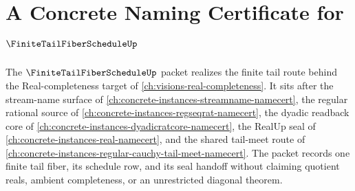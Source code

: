 \chapter{A Concrete Naming Certificate for $\FiniteTailFiberScheduleUp$}
\label{ch:concrete-instances-finite-tail-fiber-schedule-namecert}

The $\FiniteTailFiberScheduleUp$ packet realizes the finite tail route behind the Real-completeness target of \autoref{ch:visions-real-completeness}. It sits after the stream-name surface of \autoref{ch:concrete-instances-streamname-namecert}, the regular rational source of \autoref{ch:concrete-instances-regseqrat-namecert}, the dyadic readback core of \autoref{ch:concrete-instances-dyadicratcore-namecert}, the RealUp seal of \autoref{ch:concrete-instances-real-namecert}, and the shared tail-meet route of \autoref{ch:concrete-instances-regular-cauchy-tail-meet-namecert}. The packet records one finite tail fiber, its schedule row, and its seal handoff without claiming quotient reals, ambient completeness, or an unrestricted diagonal theorem.

